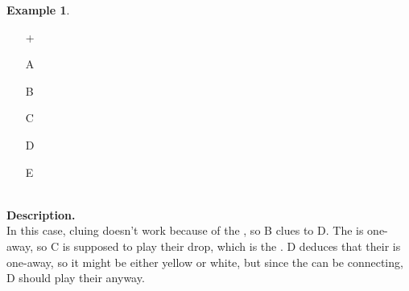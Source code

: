 \documentclass[a4paper]{article}
\theoremstyle{plain}
\theoremstyle{definition}
\newtheorem{example}[theorem]{Example}
\begin{document}
\begin{example}	\hfill \\
	\begin{minipage}{0.45\textwidth}
		\begin{itemize}
			\item[\Large +]      
			\item[\Large A]    
			\item[\Large B]    
			\item[\Large C]    
			\item[\Large D]    
			\item[\Large E]    
		\end{itemize}
	\end{minipage}%
	\begin{minipage}{0.55\textwidth}
		\hfill \\
		
		\textbf{Description.} \\
		
		In this case, cluing  doesn't work because of the , so B clues  to D. The  is one-away, so C is supposed to play their drop, which is the . D deduces that their  is one-away, so it might be either yellow or white, but since the  can be connecting, D should play their  anyway.
	\end{minipage}
\end{example} \vspace{0.15 cm}
\end{document}
